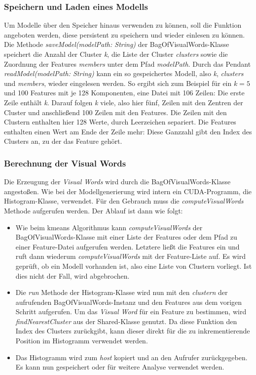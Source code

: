 \subsubsection{Speichern und Laden eines Modells}

Um Modelle über den Speicher hinaus verwenden zu können, soll die Funktion angeboten werden, diese persistent zu speichern und wieder einlesen zu können. Die Methode \textit{saveModel(modelPath: String)} der BagOfVisualWords-Klasse speichert die Anzahl der Cluster \textit{k}, die Liste der Cluster \textit{clusters} sowie die Zuordnung der Features \textit{members} unter dem Pfad \textit{modelPath}. Durch das Pendant \textit{readModel(modelPath: String)} kann ein so gespeichertes Modell, also \textit{k}, \textit{clusters} und \textit{members}, wieder eingelesen werden.\newline
So ergibt sich zum Beispiel für ein $k = 5$ und 100 Features mit je 128 Komponenten, eine Datei mit 106 Zeilen: Die erste Zeile enthält \textit{k}. Darauf folgen \textit{k} viele, also hier fünf, Zeilen mit den Zentren der Cluster und anschließend 100 Zeilen mit den Features. Die Zeilen mit den Clustern enthalten hier 128 Werte, durch Leerzeichen separiert. Die Features enthalten einen Wert am Ende der Zeile mehr: Diese Ganzzahl gibt den Index des Clusters an, zu der das Feature gehört.

\subsubsection{Berechnung der Visual Words}

Die Erzeugung der \textit{Visual Words} wird durch die BagOfVisualWords-Klasse angestoßen. Wie bei der Modellgenerierung wird intern ein CUDA-Programm, die Histogram-Klasse, verwendet. Für den Gebrauch muss die \textit{computeVisualWords} Methode aufgerufen werden. Der Ablauf ist dann wie folgt:

\begin{itemize}
	\item Wie beim kmeans Algorithmus kann \textit{computeVisualWords} der BagOfVisualWords-Klasse mit einer Liste der Features oder dem Pfad zu einer Feature-Datei aufgerufen werden. Letztere ließt die Features ein und ruft dann wiederum \textit{computeVisualWords} mit der Feature-Liste auf. Es wird geprüft, ob ein Modell vorhanden ist, also eine Liste von Clustern vorliegt. Ist dies nicht der Fall, wird abgebrochen.
	\item Die \textit{run} Methode der Histogram-Klasse wird nun mit den \textit{clustern} der aufrufenden BagOfVisualWords-Instanz und den Features aus dem vorigen Schritt aufgerufen. Um das \textit{Visual Word} für ein Feature zu bestimmen, wird \textit{findNearestCluster} aus der Shared-Klasse genutzt. Da diese Funktion den Index des Clusters zurückgibt, kann dieser direkt für die zu inkrementierende Position im Histogramm verwendet werden.
	\item Das Histogramm wird zum \textit{host} kopiert und an den Aufrufer zurückgegeben. Es kann nun gespeichert oder für weitere Analyse verwendet werden.
\end{itemize}